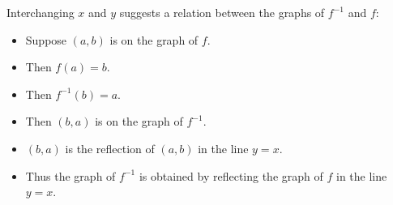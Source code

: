 \begin{frame}
\footnotesize 
Interchanging $x$ and $y$ suggests a relation between the graphs of $f^{-1}$ and $f$:
\begin{itemize}
\item<2->  Suppose $(a,b)$ is on the graph of $f$.
\item<3->  Then $f(a) = b$.
\item<4->  Then $f^{-1}(b) = a$.
\item<5->  Then $(b,a)$ is on the graph of $f^{-1}$.
\item<6->  $(b,a)$ is the reflection of $(a,b)$ in the line $y = x$.
\item<7->  Thus the graph of $f^{-1}$ is obtained by reflecting the graph of $f$ in the line $y = x$.
\end{itemize}
\end{frame}
